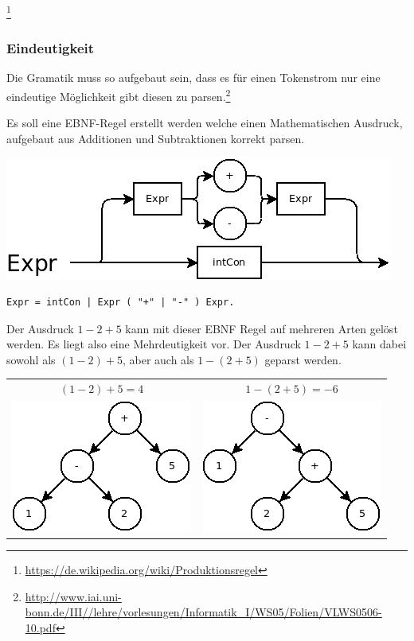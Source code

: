 \footnote{\url{https://de.wikipedia.org/wiki/Produktionsregel}}

\newpage

\subsubsection{Eindeutigkeit}

Die Gramatik muss so aufgebaut sein, dass es für einen Tokenstrom nur eine eindeutige Möglichkeit gibt diesen zu parsen.\footnote{\url{http://www.iai.uni-bonn.de/III//lehre/vorlesungen/Informatik_I/WS05/Folien/VLWS0506-10.pdf}}


Es soll eine EBNF-Regel erstellt werden welche einen Mathematischen Ausdruck, aufgebaut aus Additionen und Subtraktionen korrekt parsen.


\includegraphics[scale=0.5]{./media/images/compiler/ambiguity_wrong.png}

\begin{lstlisting}[language=EBNF]
Expr = intCon | Expr ( "+" | "-" ) Expr.
\end{lstlisting}

Der Ausdruck $1-2+5$ kann mit dieser EBNF Regel auf mehreren Arten gelöst werden. Es liegt also eine Mehrdeutigkeit vor. Der Ausdruck $1-2+5$ kann dabei sowohl als $(1-2)+5$, aber auch als $1-(2+5)$ geparst werden.

\begin{tabular}{ c | c }
  $(1-2)+5=4$ & 
  $1-(2+5)=-6$ \\
  \includegraphics[scale=0.5]{./media/images/compiler/ambiguity_tree_correct.png} & 
  \includegraphics[scale=0.5]{./media/images/compiler/ambiguity_tree_wrong.png} \\
\end{tabular}

